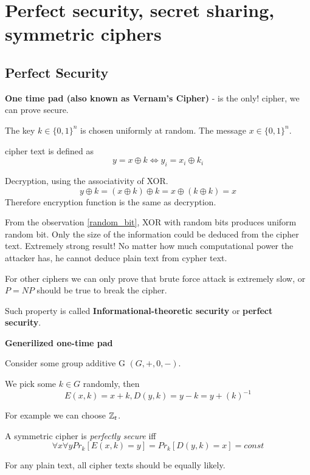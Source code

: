 \section{\texorpdfstring{Perfect security, secret sharing, symmetric ciphers}{Perfect security, secret sharing, symmetric ciphers}}
\vspace{5mm}
\large

\subsection{Perfect Security}
\begin{definition}
	\textbf{One time pad (also known as Vernam's Cipher)} - is the only! cipher, we can prove secure.

	The key $k \in \{ 0, 1 \}^n $ is chosen uniformly at random. The message $x \in \{ 0, 1 \}^n$.

	cipher text is defined as
	\[ y = x \oplus k \iff y_i = x_i \oplus k_i \]

	Decryption, using the associativity of XOR.
	\[ y \oplus k = (x \oplus k) \oplus k = x \oplus (k \oplus k) = x \]
	Therefore encryption function is the same as decryption.

	From the observation \cref{random_bit}, XOR with random bits produces uniform random bit.
	Only the size of the information could be deduced from the cipher text. Extremely strong result!
	No matter how much computational power the attacker has, he cannot deduce plain text from cypher text.

	For other ciphers we can only prove that brute force attack is extremely slow, or $P = NP$ should be true to break the cipher.

	Such property is called \textbf{Informational-theoretic security} or \textbf{perfect security}.

\end{definition}

\begin{definition}\label{gen_one_time_p}
	\textbf{Generilized one-time pad}

	Consider some group additive G $(G, +, 0, -)$.

	We pick some $k \in G$ randomly, then
	\[ E(x, k) = x + k, D(y, k) = y - k = y + (k)^{-1} \]

	For example we can choose $\operatorname{\mathbb{Z}}_t$.
\end{definition}

\begin{definition}
	A symmetric cipher is \emph{perfectly secure} iff
	\[ \forall x \forall y Pr_k[ E(x, k) = y ] = Pr_k[ D(y, k) = x ] = const \]

	For any plain text, all cipher texts should be equally likely.
\end{definition}

